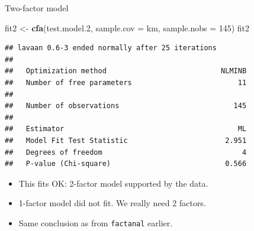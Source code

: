 \documentclass[ignorenonframetext,]{beamer}
\newenvironment{Shaded}{\begin{snugshade}}{\end{snugshade}}
\newcommand{\DataTypeTok}[1]{\textcolor[rgb]{0.13,0.29,0.53}{#1}}
\newcommand{\DecValTok}[1]{\textcolor[rgb]{0.00,0.00,0.81}{#1}}
\newcommand{\FloatTok}[1]{\textcolor[rgb]{0.00,0.00,0.81}{#1}}
\newcommand{\KeywordTok}[1]{\textcolor[rgb]{0.13,0.29,0.53}{\textbf{#1}}}
\newcommand{\NormalTok}[1]{#1}
\newcommand{\StringTok}[1]{\textcolor[rgb]{0.31,0.60,0.02}{#1}}
\begin{document}
\begin{frame}[fragile]{Two-factor model}
\protect\hypertarget{two-factor-model}{}

\scriptsize

\begin{Shaded}
\begin{Highlighting}[]
\NormalTok{fit2 <-}\StringTok{ }\KeywordTok{cfa}\NormalTok{(test.model}\FloatTok{.2}\NormalTok{, }\DataTypeTok{sample.cov =}\NormalTok{ km, }\DataTypeTok{sample.nobs =} \DecValTok{145}\NormalTok{)}
\NormalTok{fit2}
\end{Highlighting}
\end{Shaded}

\begin{verbatim}
## lavaan 0.6-3 ended normally after 25 iterations
## 
##   Optimization method                           NLMINB
##   Number of free parameters                         11
## 
##   Number of observations                           145
## 
##   Estimator                                         ML
##   Model Fit Test Statistic                       2.951
##   Degrees of freedom                                 4
##   P-value (Chi-square)                           0.566
\end{verbatim}

\normalsize

\begin{itemize}
\item
  This fits OK: 2-factor model supported by the data.
\item
  1-factor model did not fit. We really need 2 factors.
\item
  Same conclusion as from \texttt{factanal} earlier.
\end{itemize}

\end{frame}
\end{document}
